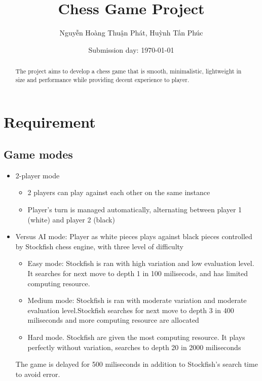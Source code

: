 \documentclass[a4paper, 10pt, titlepage]{report}
\title{Chess Game Project}
\author{Nguyễn Hoàng Thuận Phát, Huỳnh Tấn Phúc}
\date{Submission day: \selectlanguage{english}\today}
\begin{document}
\maketitle
{}
\renewcommand{\abstractname}{Overview}
\begin{abstract}
  The project aims to develop a chess game that is smooth, minimalistic, lightweight in size and performance while providing decent experience to player.
\end{abstract}

\tableofcontents
\chapter{Requirement}

\section{Game modes}
\begin{itemize}
  \item 2-player mode
        \begin{itemize}
          \item 2 players can play against each other on the same instance
          \item Player's turn is managed automatically, alternating between player 1 (white) and player 2 (black)
        \end{itemize}
  \item Versus AI mode: Player as white pieces plays against black pieces controlled by Stockfish chess engine, with three level of difficulty
        \begin{itemize}
          \item Easy mode: Stockfish is ran with high variation and low evaluation level. It searches for next move to depth 1 in 100 milisecods, and has limited computing resource.
          \item Medium mode: Stockfish is ran with moderate variation and moderate evaluation level.Stockfish searches for next move to depth 3 in 400 miliseconds and more computing resource are allocated
          \item Hard mode. Stockfish are given the most computing resource. It plays perfectly without variation, searches to depth 20 in 2000 miliseconds
        \end{itemize}
        The game is delayed for 500 miliseconds in addition to Stockfish's search time to avoid error.
\end{itemize}
\end{document}
